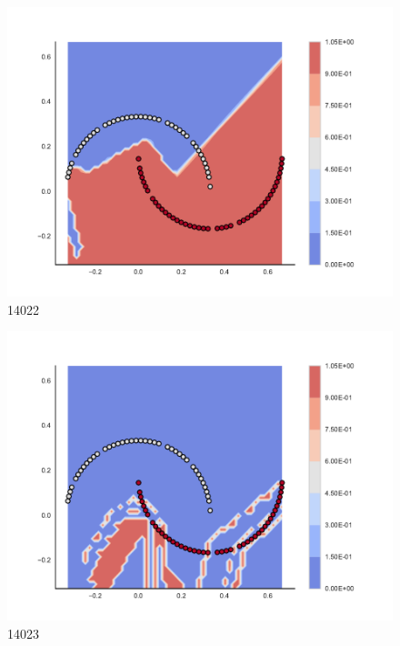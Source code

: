 \begin{subfigure}[b]{0.09\textwidth}
    \includegraphics[width=\textwidth]{img/convergence/14022.pdf}
    \caption{14022}
    \label{fig:convergence_14022}
\end{subfigure}
%
\begin{subfigure}[b]{0.09\textwidth}
    \includegraphics[width=\textwidth]{img/convergence/14023.pdf}
    \caption{14023}
    \label{fig:convergence_14023}
\end{subfigure}
%
